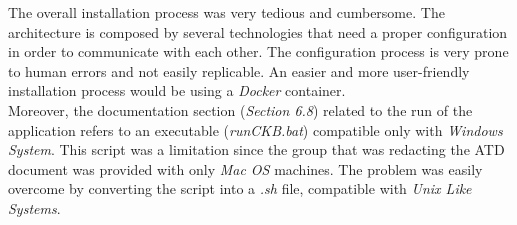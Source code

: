 The overall installation process was very tedious and cumbersome. The architecture is composed by several technologies that need a proper configuration in order to communicate with each other. The configuration process is very prone to human errors and not easily replicable. An easier and more user-friendly installation process would be using a \textit{Docker} container. \\
Moreover, the documentation section (\textit{Section 6.8}) related to the run of the application refers to an executable (\textit{runCKB.bat}) compatible only with \textit{Windows System}. This script was a limitation since the group that was redacting the ATD document was provided with only \textit{Mac OS} machines. The problem was easily overcome by converting the script into a \textit{.sh} file, compatible with \textit{Unix Like Systems}.
